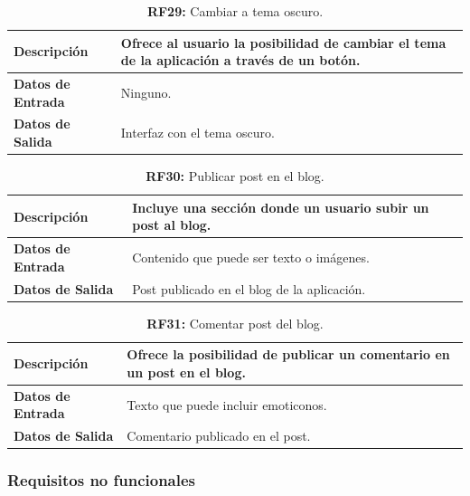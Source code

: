 \documentclass[a4paper, 12pt]{article}
\begin{document}
\begin{table}[H]
\captionsetup{list=no}%
\captionsetup{justification=raggedright,singlelinecheck=false}
\captionsetup{labelformat=empty}
\caption*{\textbf{RF29:} Cambiar a tema oscuro.}
\label{tab:RF29}
	\begin{tabular}{|m{5cm}|m{10cm}|}
	\hline
	\textbf{Descripción} & Ofrece al usuario la posibilidad de cambiar el tema de la aplicación a través de un botón. \\ 
	\hline
	\textbf{Datos de Entrada} & Ninguno.\\ 
	\hline
	\textbf{Datos de Salida} & Interfaz con el tema oscuro.  \\ 
	\hline
\end{tabular}
\end{table}

\begin{table}[H]
\captionsetup{list=no}%
\captionsetup{justification=raggedright,singlelinecheck=false}
\captionsetup{labelformat=empty}
\caption*{\textbf{RF30:} Publicar post en el blog.}
\label{tab:RF30}
	\begin{tabular}{|m{5cm}|m{10cm}|}
	\hline
	\textbf{Descripción} & Incluye una sección donde un usuario subir un post al blog. \\ 
	\hline
	\textbf{Datos de Entrada} & Contenido que puede ser texto o imágenes. \\ 
	\hline
	\textbf{Datos de Salida} & Post publicado en el blog de la aplicación. \\ 
	\hline
\end{tabular}
\end{table}

\begin{table}[H]
\captionsetup{list=no}%
\captionsetup{justification=raggedright,singlelinecheck=false}
\captionsetup{labelformat=empty}
\caption*{\textbf{RF31:} Comentar post del blog.}
\label{tab:RF31}
	\begin{tabular}{|m{5cm}|m{10cm}|}
	\hline
	\textbf{Descripción} & Ofrece la posibilidad de publicar un comentario en un post en el blog. \\ 
	\hline
	\textbf{Datos de Entrada} & Texto que puede incluir emoticonos. \\ 
	\hline
	\textbf{Datos de Salida} & Comentario publicado en el post. \\ 
	\hline
\end{tabular}
\end{table}


\subsubsection{Requisitos no funcionales}
\end{document}

